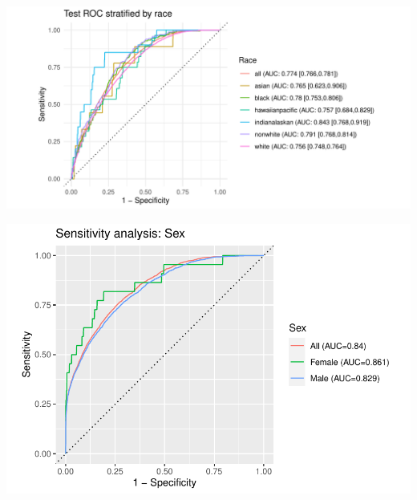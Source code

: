 \documentclass[12pt]{article}
\begin{document}
\begin{center}
\includegraphics[width=\textwidth]{figures/roc_Race.pdf}
\end{center}

\begin{center}
\includegraphics[width=\textwidth]{figures/roc_Gender.pdf}
\end{center}

\clearpage
\end{document}
